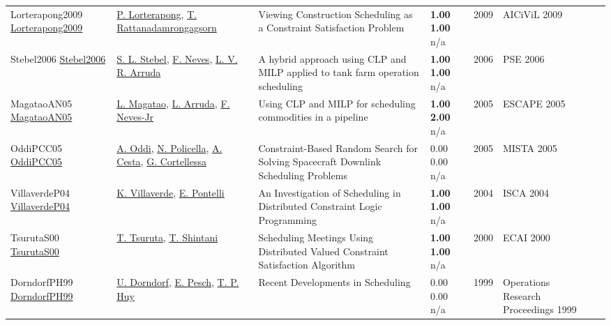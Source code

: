 {\begin{longtable}{p{3cm}p{5cm}p{10cm}p{1cm}rp{2.5cm}l}
Lorterapong2009 \href{http://dx.doi.org/10.4203/ccp.74.8}{Lorterapong2009} & \hyperref[auth:a1936]{P. Lorterapong}, \hyperref[auth:a1937]{T. Rattanadamrongagsorn} & Viewing Construction Scheduling as a Constraint Satisfaction Problem & \noindent{}\textbf{1.00} \textbf{1.00} n/a & 2009 & AICiViL 2009 & \cite{Lorterapong2009}\\
Stebel2006 \href{http://dx.doi.org/10.1016/s1570-7946(06)80377-9}{Stebel2006} & \hyperref[auth:a1862]{S. L. Stebel}, \hyperref[auth:a1863]{F. Neves}, \hyperref[auth:a1806]{L. V. R. Arruda} & A hybrid approach using CLP and MILP applied to tank farm operation scheduling & \noindent{}\textbf{1.00} \textbf{1.00} n/a & 2006 & PSE 2006 & \cite{Stebel2006}\\
MagataoAN05 \href{https://www.sciencedirect.com/science/article/pii/S1570794605800136}{MagataoAN05} & \hyperref[auth:a1468]{L. Magatao}, \hyperref[auth:a1469]{L. Arruda}, \hyperref[auth:a1470]{F. Neves-Jr} & Using CLP and MILP for scheduling commodities in a pipeline & \noindent{}\textbf{1.00} \textbf{2.00} n/a & 2005 & ESCAPE 2005 & \cite{MagataoAN05}\\
OddiPCC05 \href{http://dx.doi.org/10.1007/0-387-27744-7_7}{OddiPCC05} & \hyperref[auth:a282]{A. Oddi}, \hyperref[auth:a283]{N. Policella}, \hyperref[auth:a284]{A. Cesta}, \hyperref[auth:a285]{G. Cortellessa} & Constraint-Based Random Search for Solving Spacecraft Downlink Scheduling Problems & \noindent{}\textcolor{black!50}{0.00} \textcolor{black!50}{0.00} n/a & 2005 & MISTA 2005 & \cite{OddiPCC05}\\
VillaverdeP04 \href{}{VillaverdeP04} & \hyperref[auth:a657]{K. Villaverde}, \hyperref[auth:a33]{E. Pontelli} & An Investigation of Scheduling in Distributed Constraint Logic Programming & \noindent{}\textbf{1.00} \textbf{1.00} n/a & 2004 & ISCA 2004 & \cite{VillaverdeP04}\\
TsurutaS00 \href{}{TsurutaS00} & \hyperref[auth:a1265]{T. Tsuruta}, \hyperref[auth:a1266]{T. Shintani} & Scheduling Meetings Using Distributed Valued Constraint Satisfaction Algorithm & \noindent{}\textbf{1.00} \textbf{1.00} n/a & 2000 & ECAI 2000 & \cite{TsurutaS00}\\
DorndorfPH99 \href{http://dx.doi.org/10.1007/978-3-642-58409-1_35}{DorndorfPH99} & \hyperref[auth:a903]{U. Dorndorf}, \hyperref[auth:a437]{E. Pesch}, \hyperref[auth:a904]{T. P. Huy} & Recent Developments in Scheduling & \noindent{}\textcolor{black!50}{0.00} \textcolor{black!50}{0.00} n/a & 1999 & Operations Research Proceedings 1999 & \cite{DorndorfPH99}\\

\end{longtable}}
